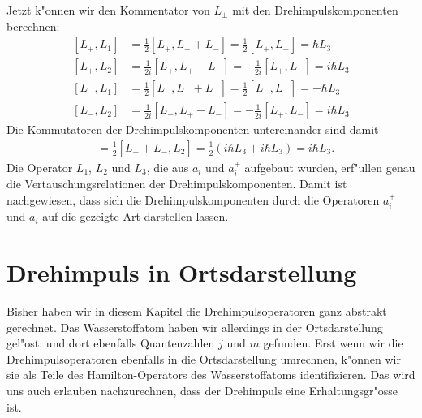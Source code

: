 Jetzt k"onnen wir den Kommentator von $L_\pm$ mit den
Drehimpulskomponenten berechnen:
\begin{align*}
[L_+,L_1]
&=
\frac12[L_+,L_++L_-]
=
\frac12[L_+,L_-]
=
\hbar L_3
\\
[L_+,L_2]
&=
\frac1{2i}[L_+,L_+-L_-]
=
-\frac1{2i}[L_+,L_-]
=
i\hbar L_3
\\
[L_-,L_1]
&=
\frac1{2}
[L_-,L_++L_-]
=
\frac12[L_-,L_+]
=
-\hbar L_3
\\
[L_-,L_2]
&=
\frac1{2i}[L_-,L_+-L_-]
=
-\frac1{2i}[L_+,L_-]
=
i\hbar L_3
\end{align*}
Die Kommutatoren der Drehimpulskomponenten untereinander sind damit
\begin{align*}
[L_1,L_2]
&=
\frac12[L_++L_-,L_2]
=
\frac12(i\hbar L_3+i\hbar L_3)
=
i\hbar L_3.
\end{align*}
Die Operator $L_1$, $L_2$ und $L_3$, die aus $a_i$ und $a_i^+$
aufgebaut wurden, erf"ullen genau die  Vertauschungsrelationen
der Drehimpulskomponenten.
Damit ist nachgewiesen, dass sich die Drehimpulskomponenten
durch die Operatoren $a_i^+$ und $a_i$ auf die gezeigte Art
darstellen lassen.

\section{Drehimpuls in Ortsdarstellung\label{section:drehimpulsortsdarstellung}}
Bisher haben wir in diesem Kapitel die Drehimpulsoperatoren ganz abstrakt
gerechnet. 
Das Wasserstoffatom haben wir allerdings in der Ortsdarstellung 
gel"ost, und dort ebenfalls Quantenzahlen $j$ und $m$ gefunden.
Erst wenn wir die Drehimpulsoperatoren ebenfalls in die Ortsdarstellung
umrechnen, k"onnen wir sie als Teile des Hamilton-Operators des
Wasserstoffatoms identifizieren.
Das wird uns auch erlauben nachzurechnen, dass der Drehimpuls eine
Erhaltungsgr"osse ist.

